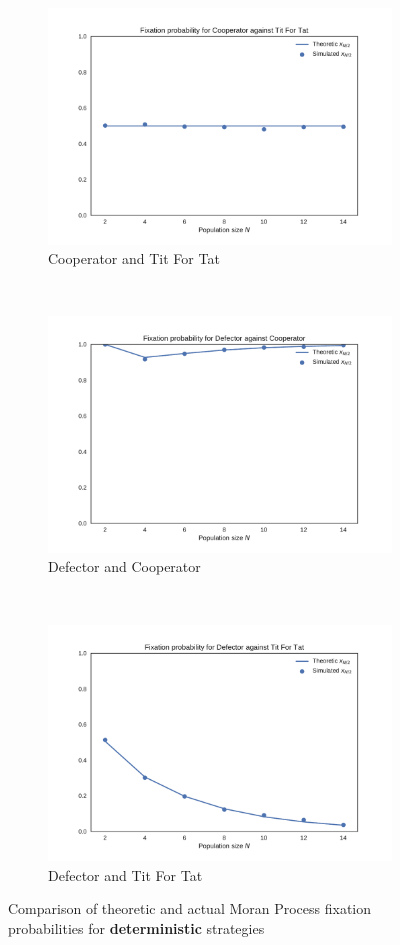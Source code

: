 \documentclass{article}
\begin{document}
{\begin{figure}[!hbtp]
    \begin{subfigure}[t]{.3\textwidth}
        \centering
        \includegraphics[width=.8\textwidth]{../img/Cooperator_v_Tit_For_Tat_1000_repetitions.pdf}
        \caption{Cooperator and Tit For Tat}
    \end{subfigure}%
    ~
    \begin{subfigure}[t]{.3\textwidth}
        \centering
        \includegraphics[width=.8\textwidth]{../img/Defector_v_Cooperator_1000_repetitions.pdf}
        \caption{Defector and Cooperator}
    \end{subfigure}%
    ~
    \begin{subfigure}[t]{.3\textwidth}
        \centering
        \includegraphics[width=.8\textwidth]{../img/Defector_v_Tit_For_Tat_1000_repetitions.pdf}
        \caption{Defector and Tit For Tat}
    \end{subfigure}%
    \caption{Comparison of theoretic and actual Moran Process fixation probabilities for \textbf{deterministic} strategies}
    \label{fig:comparison_deterministic}
\end{figure}

}
\end{document}
